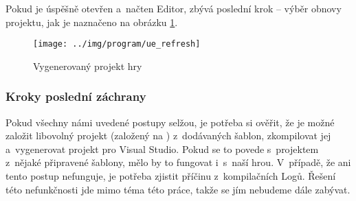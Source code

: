 Pokud je úspěšně otevřen a~načten Editor, zbývá poslední krok -- výběr obnovy projektu, jak je naznačeno na obrázku \ref{fig:ue_refresh}.

\begin{figure}[!ht]\centering
\texttt{[image: ../img/program/ue\_refresh]}

\caption{Vygenerovaný projekt hry}
\label{fig:ue_refresh}

\end{figure}

\FloatBarrier


\subsubsection{Kroky poslední záchrany}
Pokud všechny námi uvedené postupy selžou, je potřeba si ověřit, že je možné založit libovolný projekt (založený na \CPP{}) z~dodávaných šablon, zkompilovat jej a~vygenerovat projekt pro Visual Studio. Pokud se to povede s~projektem z~nějaké připravené šablony, mělo by to fungovat i~s~naší hrou. V~případě, že ani tento postup nefunguje, je potřeba zjistit příčinu z~kompilačních Logů. Řešení této nefunkčnosti jde mimo téma této práce, takže se jím nebudeme dále zabývat.






